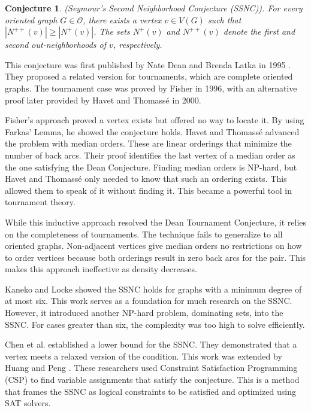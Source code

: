 \documentclass[AMS, Times1COL]{article} %
\newtheorem{conjecture}[theorem]{Conjecture}
\theoremstyle{definition}
\begin{document}
	\begin{conjecture}\label{nbconj}
		(Seymour's Second Neighborhood Conjecture (SSNC)). For every oriented graph $G \in \mathcal{O}$, there exists a vertex $v \in V(G)$ such that $|N^{++}(v)| \geq |N^+(v)|$. The sets $N^+(v)$ and $N^{++}(v)$ denote the first and second out-neighborhoods of $v$, respectively.
	\end{conjecture}
	
	This conjecture was first published by Nate Dean and Brenda Latka in 1995 \cite{DL}. They proposed a related version for tournaments, which are complete oriented graphs. The tournament case was proved by Fisher \cite{F} in 1996, with an alternative proof later provided by Havet and Thomassé \cite{HT} in 2000.
	
	Fisher's approach \cite{F} proved a vertex exists but offered no way to locate it. By using Farkas' Lemma, he showed the conjecture holds. Havet and Thomassé \cite{HT} advanced the problem with median orders. These are linear orderings that minimize the number of back arcs. Their proof identifies the last vertex of a median order as the one satisfying the Dean Conjecture. Finding median orders is NP-hard, but Havet and Thomassé only needed to know that such an ordering exists. This allowed them to speak of it without finding it. This became a powerful tool in tournament theory.
	
	While this inductive approach resolved the Dean Tournament Conjecture, it relies on the completeness of tournaments. The technique fails to generalize to all oriented graphs. Non-adjacent vertices give median orders no restrictions on how to order vertices because both orderings result in zero back arcs for the pair. This makes this approach ineffective as density decreases.
	
	Kaneko and Locke \cite{KL} showed the SSNC holds for graphs with a minimum degree of at most six. This work serves as a foundation for much research on the SSNC. However, it introduced another NP-hard problem, dominating sets, into the SSNC. For cases greater than six, the complexity was too high to solve efficiently.
	
	Chen et al. \cite{CS} established a lower bound for the SSNC. They demonstrated that a vertex meets a relaxed version of the condition. This work was extended by Huang and Peng \cite{HP}. These researchers used Constraint Satisfaction Programming (CSP) to find variable assignments that satisfy the conjecture. This is a method that frames the SSNC as logical constraints to be satisfied and optimized using SAT solvers.
	
\end{document}
